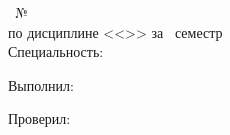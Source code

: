 \begin{center}
    \PageTitleDepartment
\end{center}

\vfill

\begin{center}
    \PageTitleDocumentName~№\PageTitleDocumentNumber\\
    по дисциплине <<\PageTitleLesson>> за \PageTitleLessonSemestr~семестр\\
    Специальность: \PageTitleSpecialty\\
\end{center}

\vfill

\begin{flushright}
    \begin{minipage}[t]{7cm}
        Выполнил:\\
        \PageTitleStudentInfo
        \PageTitleDateField
        \hspace{0pt}

        Проверил:\\
        \PageTitleTeacherInfo
        \PageTitleDateField
    \end{minipage}
\end{flushright}

\vfill

\begin{center}
    \PageTitleCity~\ESKDtheYear
\end{center}
